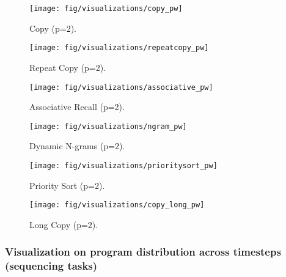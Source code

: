 \documentclass[english]{article}
\begin{document}
\begin{figure}[H]
\begin{centering}
\texttt{[image: fig/visualizations/copy\_pw]}
\par\end{centering}
\caption{Copy (p=2).}

\end{figure}
\begin{figure}[H]
\begin{centering}
\texttt{[image: fig/visualizations/repeatcopy\_pw]}
\par\end{centering}
\caption{Repeat Copy (p=2).}
\end{figure}
\begin{figure}[H]
\begin{centering}
\texttt{[image: fig/visualizations/associative\_pw]}
\par\end{centering}
\caption{Associative Recall (p=2).}
\end{figure}
\begin{figure}[H]
\begin{centering}
\texttt{[image: fig/visualizations/ngram\_pw]}
\par\end{centering}
\caption{Dynamic N-grams (p=2).}
\end{figure}
\begin{figure}[H]
\begin{centering}
\texttt{[image: fig/visualizations/prioritysort\_pw]}
\par\end{centering}
\caption{Priority Sort (p=2).}
\end{figure}
\begin{figure}[H]
\begin{centering}
\texttt{[image: fig/visualizations/copy\_long\_pw]}
\par\end{centering}
\caption{Long Copy (p=2).}
\end{figure}

\subsubsection{Visualization on program distribution across timesteps (sequencing
tasks)\label{subsec:Visualization-on-program-1}}
\end{document}
